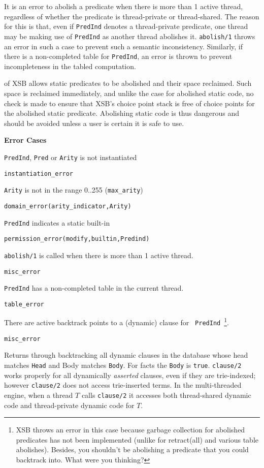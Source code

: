 \begin{description}
It is an error to abolish a predicate when there is more than 1 active
thread, regardless of whether the predicate is thread-private or
thread-shared.  The reason for this is that, even if {\tt PredInd}
denotes a thread-private predicate, one thread may be making use of
{\tt PredInd} as another thread abolishes it.  {\tt abolish/1} throws
an error in such a case to prevent such a semantic inconsistency.
Similarly, if there is a non-completed table for {\tt PredInd}, an
error is thrown to prevent incompleteness in the tabled computation.

\compatability \version{} of XSB allows static predicates to be
abolished and their space reclaimed.  Such space is reclaimed
immediately, and unlike the case for abolished static code,  no check
is made to ensure that XSB's choice point stack is free of choice
points for the abolished static predicate.  Abolishing static code is
thus dangerous and should be avoided unless a user is certain it is
safe to use.

{\bf Error Cases}
\bi
\item 	{\tt PredInd}, {\tt Pred} or {\tt Arity} is not instantiated
\bi
\item 	{\tt instantiation\_error}
\ei
%
\item 	{\tt Arity} is not in the range 0..255 ({\tt max\_arity})
\bi
\item 	{\tt domain\_error(arity\_indicator,Arity)}
\ei
%
\item 	{\tt PredInd} indicates a static built-in
\bi
\item 	{\tt permission\_error(modify,builtin,Predind)}
\ei
%
\item {\tt abolish/1} is called when there is more than 1 active thread.
\bi
\item {\tt misc\_error}
\ei
%
\item {\tt PredInd} has a non-completed table in the current thread.
\bi
\item {\tt table\_error}
\ei
%
\item There are active backtrack points to a (dynamic) clause for {\tt
  PredInd}~\footnote{XSB throws an error in this case because garbage
  collection for abolished predicates has not been implemented
  (unlike for retract(all) and various table abolishes).  Besides, you
  shouldn't be abolishing a predicate that you could backtrack into.
  What were you thinking?}. 
\bi
\item {\tt misc\_error}
\ei
%
\ei

%
Returns through backtracking all dynamic clauses in the database whose
head matches {\tt Head} and Body matches {\tt Body}.  For facts the
{\tt Body} is {\tt true}.  {\tt clause/2} works properly for all
dynamically {\em asserted} clauses, even if they are trie-indexed;
however {\tt clause/2} does not access trie-inserted terms.  In the
multi-threaded engine, when a thread $T$ calls {\tt clause/2} it
accesses both thread-shared dynamic code and thread-private dynamic
code for $T$.


\end{description}
